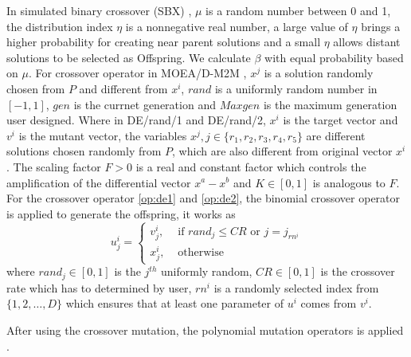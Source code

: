 \documentclass[journal]{IEEEtran}
\begin{document}
In simulated binary crossover (SBX) \cite{sbc}, $\mu$ is a random number between 0 and 1, the distribution index $\eta$ is a nonnegative real number, a large value of $\eta$ brings a higher probability for creating near parent solutions and a small $\eta$ allows distant solutions to be selected as Offspring. We calculate $\beta$ with equal probability based on $\mu$.
For crossover operator in MOEA/D-M2M \cite{m2m}, $x^j$ is a solution randomly chosen from $P$ and different from $x^i$, $\textit{rand}$ is a uniformly random number in $[-1,1]$, $\textit{gen}$ is the currnet generation and $\textit{Maxgen}$ is the maximum generation user designed.
Where in DE/rand/1 and DE/rand/2, $x^i$ is the target vector and $v^i$ is the mutant vector, the variables $x^j, j \in \{r_1,r_2,r_3,r_4,r_5\}$ are different solutions chosen randomly from $P$, which are also different from original vector $x^i$. The scaling factor $F > 0$ is a real and constant factor which controls the amplification of the differential vector $x^a-x^b$ and $K \in [0,1]$ is analogous to $F$. For the crossover operator \ref{op:de1} and \ref{op:de2}, the binomial crossover operator \cite{storn1997differential} is applied to generate the offspring, it works as
\begin{equation}
    u_{j}^{i}=\left\{\begin{array}{ll}
        v_{j}^{i}, & \text { if }  { rand_j } \leq CR \text { or } j=j_{ {rn^i }} \\
        x_{j}^{i}, & \text { otherwise }
    \end{array}\right.
\end{equation}
where $rand_j \in [0,1]$ is the $j^{th}$ uniformly random, $CR \in [0,1]$ is the crossover rate which has to determined by user, $rn^i$ is a randomly selected index from $\{1,2,\dots,D\}$ which ensures that at least one parameter of $u^i$ comes from $v^i$.

After using the crossover mutation, the polynomial mutation operators is applied \cite{deb1996combined}.
\end{document}
